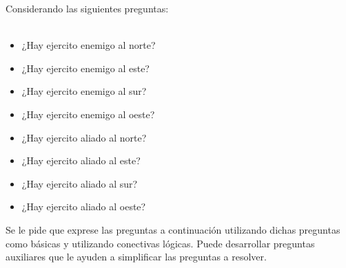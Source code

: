 \documentclass[12pt, addpoints]{../../common/epyl_exam_template}
\begin{document}
\begin{questions}
  \jump
  \question
    Considerando las siguientes preguntas:\\
    ~\\
    \begin{minipage}{0.46\textwidth}
      \begin{itemize}
        \item ¿Hay ejercito enemigo al norte?
        \item ¿Hay ejercito enemigo al este?
        \item ¿Hay ejercito enemigo al sur?
        \item ¿Hay ejercito enemigo al oeste?
      \end{itemize}
    \end{minipage}
    \begin{minipage}{0.46\textwidth}
      \begin{itemize}
        \item ¿Hay ejercito aliado al norte?
        \item ¿Hay ejercito aliado al este?
        \item ¿Hay ejercito aliado al sur?
        \item ¿Hay ejercito aliado al oeste?
      \end{itemize}
    \end{minipage}
    \jump
    Se le pide que exprese las preguntas a continuación utilizando dichas preguntas
    como básicas y utilizando conectivas lógicas. Puede desarrollar preguntas
    auxiliares que le ayuden a simplificar las preguntas a resolver.
\end{questions}
\end{document}
